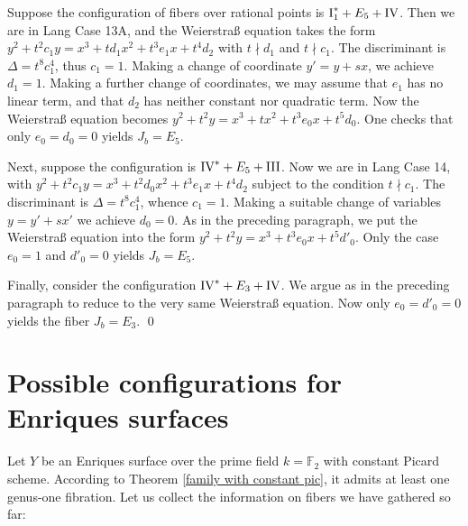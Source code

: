\documentclass[oneside, 12pt]{amsart}
\newcommand\mylabel[1]{\label{#1}\marginpar{\vspace{-1ex}\medskip\medskip\footnotesize \tt #1}}
\renewcommand\mylabel[1]{\label{#1}}
\theoremstyle{definition}
\theoremstyle{remark}
\newcommand{\FF}{\mathbb{F}}
\newcommand{\I}{\text{\rm I}}
\newcommand{\III}{\text{\rm III}}
\newcommand{\IV}{\text{\rm IV}}
\begin{document}
Suppose the configuration of fibers over rational points is $\I_1^*+E_5+\IV$.
Then we are in Lang Case 13A, and the Weierstra\ss{} equation takes the form
$y^2+t^2c_1y=x^3+td_1x^2+t^3e_1x+t^4d_2$ with $t\nmid d_1$ and $t\nmid c_1$.
The discriminant is $\Delta=t^8c_1^4$, thus $c_1=1$. Making a change of coordinate $y'=y+sx$,
we achieve $d_1=1$. Making a further change of coordinates, we may assume
that $e_1$ has no linear term, and that $d_2$ has neither constant nor quadratic term.
Now the Weierstra\ss{} equation becomes $y^2+t^2y=x^3+tx^2+t^3e_0x+t^5d_0$.
One checks that only $e_0=d_0=0$ yields $J_b=E_5$.

Next, suppose the configuration is $\IV^*+E_5+ \III$.
Now we are in Lang Case 14, with $y^2+t^2c_1y=x^3+t^2d_0x^2+t^3e_1x+t^4d_2$ subject to
the condition $t\nmid c_1$. The discriminant is $\Delta=t^8c_1^4$, whence $c_1=1$.
Making a suitable change of variables $y=y'+sx'$ we   achieve $d_0=0$.
As in the preceding paragraph, we put the Weierstra\ss{} equation into
the form $y^2+t^2y=x^3+t^3e_0x+t^5d'_0$.
Only the case $e_0=1$ and $d'_0=0$ yields $J_b=E_5$.

Finally, consider the configuration $\IV^*+E_3+\IV$.
We argue as in the preceding paragraph to reduce to the very same   Weierstra\ss{} equation.
Now only $e_0=d'_0=0$ yields the fiber $J_b=E_3$. 
\qed


\section{Possible configurations for Enriques surfaces}
\mylabel{Possible configurations}

Let $Y$ be an Enriques surface over the prime field $k=\FF_2$ with constant Picard scheme. 
According to Theorem \ref{family with constant pic}, it admits at least one genus-one fibration.
Let us collect the information on   fibers we have gathered so far:
\end{document}
